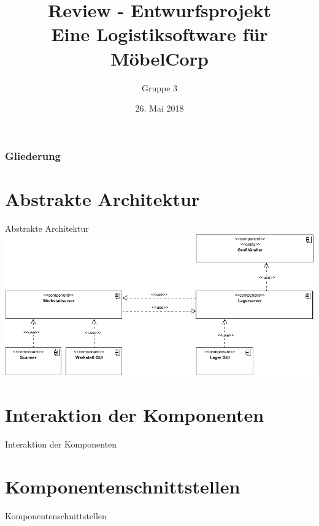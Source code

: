 \documentclass{beamer}
\begin{document}
			
	
	\title[Review - Entwurfsprojekt]{Review - Entwurfsprojekt\\ Eine Logistiksoftware für MöbelCorp}
	\author{Gruppe 3}
	
	 \begin{frame}[title=Hauptgebaeude_Nacht.jpg]
	 	\maketitle
	 	\date{26. Mai 2018}
 	\end{frame}
	 
	\begin{frame}
		\frametitle{Gliederung}
		\tableofcontents
	\end{frame}
	\section{Abstrakte Architektur}
	\begin{frame}{Abstrakte Architektur}
		\includegraphics[width=\textwidth]{PDF/abstrakte_Architektur.pdf}
	\end{frame}
	\section{Interaktion der Komponenten}
	\begin{frame}{Interaktion der Komponenten}

	\end{frame}
	\section{Komponentenschnittstellen}
	\begin{frame}{Komponentenschnittstellen}

	\end{frame}
\end{document}
